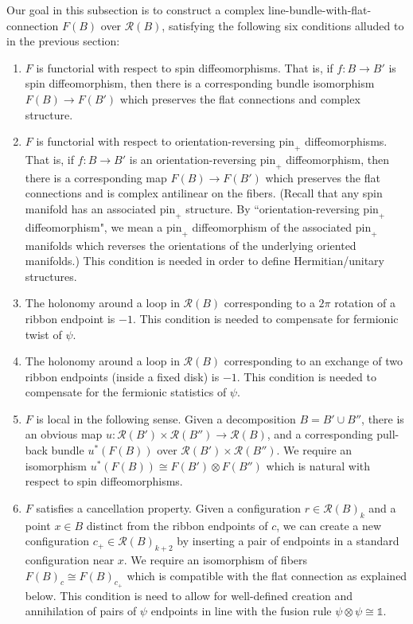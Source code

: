 \documentclass[12pt,a4paper]{article}
\newcommand{\tp}{\otimes}
\newcommand{\unit}{\mathds{1}}
\newcommand{\mcr}{\mathcal{R}}
\begin{document}
Our goal in this subsection is to construct a complex line-bundle-with-flat-connection $F(B)$ over $\mcr(B)$,
satisfying the following six conditions alluded to in the previous section:
\begin{enumerate}
\item $F$ is functorial with respect to spin diffeomorphisms. That is,
if $f: B \to B'$ is spin diffeomorphism, then there is a corresponding bundle isomorphism $F(B) \to F(B')$ which
preserves the flat connections and complex structure.
\item $F$ is functorial with respect to orientation-reversing $\mbox{pin}_+$ diffeomorphisms. That is, 
if $f: B \to B'$ is an orientation-reversing $\mbox{pin}_+$ diffeomorphism, then there is a corresponding map
$F(B) \to F(B')$ which preserves the flat connections and is complex antilinear on the fibers.
(Recall that any spin manifold has an associated $\mbox{pin}_+$ structure.
By ``orientation-reversing $\mbox{pin}_+$ diffeomorphism", we mean a $\mbox{pin}_+$ diffeomorphism
of the associated $\mbox{pin}_+$ manifolds which reverses the orientations of the underlying oriented manifolds.)
This condition is needed in order to define Hermitian/unitary structures.
\item The holonomy around a loop in $\mcr(B)$ corresponding to a $2\pi$ rotation of a ribbon endpoint is $-1$.
This condition is needed to compensate for fermionic twist of $\psi$.
\item The holonomy around a loop in $\mcr(B)$ corresponding to an exchange of two ribbon endpoints 
(inside a fixed disk) is $-1$.
This condition is needed to compensate for the fermionic statistics of $\psi$.
\item $F$ is local in the following sense.
Given a decomposition $B = B'\cup B''$, there is an obvious map $u: \mcr(B')\times\mcr(B'')\to\mcr(B)$, 
and a corresponding pull-back bundle $u^*(F(B))$ over $\mcr(B')\times\mcr(B'')$.
We require an isomorphism $u^*(F(B)) \cong F(B')\otimes F(B'')$ which is natural with respect to spin diffeomorphisms.
\item $F$ satisfies a cancellation property.
Given a configuration $r \in \mcr(B)_k$ and a point $x\in B$ distinct from the ribbon endpoints of $c$,
we can create a new configuration $c_+ \in \mcr(B)_{k+2}$ by inserting a pair of endpoints in a standard configuration
near $x$.
We require an isomorphism of fibers $F(B)_c \cong F(B)_{c_+}$ which is compatible with the flat connection as explained below.
This condition is need to allow for well-defined creation and annihilation of pairs of $\psi$ endpoints in line with the fusion rule $\psi \tp \psi \cong \unit$.
\end{enumerate}
\end{document}
